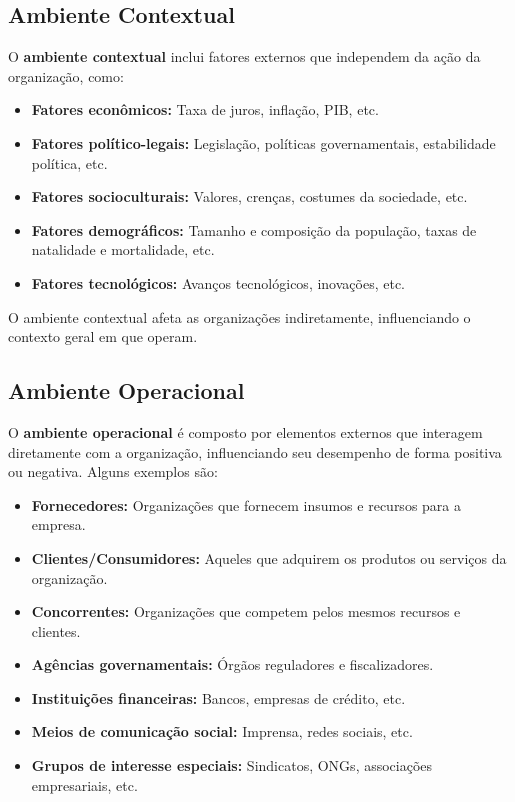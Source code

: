 \subsection{Ambiente Contextual}

O \textbf{ambiente contextual} inclui fatores externos que independem da ação da organização, como:

\begin{itemize}
    \item \textbf{Fatores econômicos:} Taxa de juros, inflação, PIB, etc.
    \item \textbf{Fatores político-legais:} Legislação, políticas governamentais, estabilidade política, etc.
    \item \textbf{Fatores socioculturais:} Valores, crenças, costumes da sociedade, etc.
    \item \textbf{Fatores demográficos:} Tamanho e composição da população, taxas de natalidade e mortalidade, etc.
    \item \textbf{Fatores tecnológicos:} Avanços tecnológicos, inovações, etc.
\end{itemize}

O ambiente contextual afeta as organizações indiretamente, influenciando o contexto geral em que operam.

\subsection{Ambiente Operacional}

O \textbf{ambiente operacional} é composto por elementos externos que interagem diretamente com a organização, influenciando seu desempenho de forma positiva ou negativa. Alguns exemplos são:

\begin{itemize}
    \item \textbf{Fornecedores:} Organizações que fornecem insumos e recursos para a empresa.
    \item \textbf{Clientes/Consumidores:} Aqueles que adquirem os produtos ou serviços da organização.
    \item \textbf{Concorrentes:} Organizações que competem pelos mesmos recursos e clientes.
    \item \textbf{Agências governamentais:} Órgãos reguladores e fiscalizadores.
    \item \textbf{Instituições financeiras:} Bancos, empresas de crédito, etc.
    \item \textbf{Meios de comunicação social:} Imprensa, redes sociais, etc.
    \item \textbf{Grupos de interesse especiais:} Sindicatos, ONGs, associações empresariais, etc.
\end{itemize}

